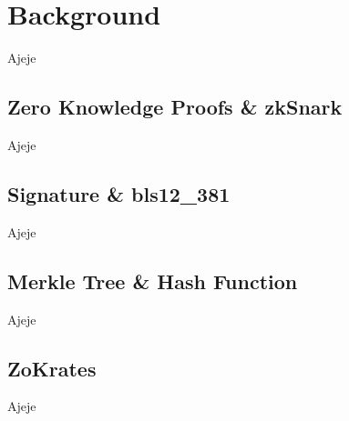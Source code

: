 \chapter{Background}

Ajeje

\section{Zero Knowledge Proofs \& zkSnark}

Ajeje

\section{Signature \& bls12\_381}

Ajeje

\section{Merkle Tree \& Hash Function}

Ajeje

\section{ZoKrates}

Ajeje

